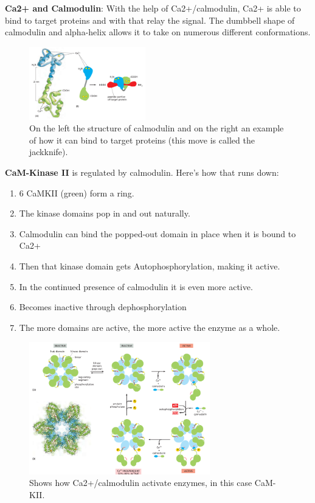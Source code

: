 \documentclass[../main.tex]{subfiles}
\begin{document}
\textbf{Ca2+ and \gls{Calmodulin}}: With the help of Ca2+/calmodulin, Ca2+ is able to bind to target proteins and with that relay the signal. The dumbbell shape of calmodulin and alpha-helix allows it to take on numerous different conformations.
\begin{figure}[H]
	\centering
	\includegraphics[width=0.45\textwidth]{Ca2_cal}
	\caption{On the left the structure of calmodulin and on the right an example of how it can bind to target proteins (this move is called the jackknife).}
\end{figure}

\textbf{CaM-Kinase II} is regulated by calmodulin. Here's how that runs down:
\begin{enumerate}
	\item 6 \gls{CaMKII} (green) form a ring. 
	\item The kinase domains pop in and out naturally.
	\item Calmodulin can bind the popped-out domain in place when it is bound to Ca2+
	\item Then that kinase domain gets \gls{Autophosphorylation}, making it active.
	\item In the continued presence of calmodulin it is even more active.
	\item Becomes inactive through dephosphorylation
	\item The more domains are active, the more active the enzyme as a whole.
\end{enumerate}
\begin{figure}[H]
	\centering
	\includegraphics[width=0.7\textwidth]{Ca2_cam}
	\caption{Shows how Ca2+/calmodulin activate enzymes, in this case CaM-KII.}
\end{figure}
\end{document}
